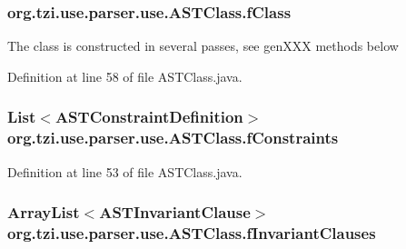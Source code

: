 \hypertarget{classorg_1_1tzi_1_1use_1_1parser_1_1use_1_1_a_s_t_class_ad31d3b0c19e264bc511403a79458cee6}{
\subsubsection[{f\-Class}]{ org.\-tzi.\-use.\-parser.\-use.\-A\-S\-T\-Class.\-f\-Class\hspace{0.3cm}{\ttfamily [protected]}}}\label{classorg_1_1tzi_1_1use_1_1parser_1_1use_1_1_a_s_t_class_ad31d3b0c19e264bc511403a79458cee6}
The class is constructed in several passes, see gen\-X\-X\-X methods below 

Definition at line 58 of file A\-S\-T\-Class.\-java.

\hypertarget{classorg_1_1tzi_1_1use_1_1parser_1_1use_1_1_a_s_t_class_aa87b63de84b1ab405c1b484ae663bdd5}{
\subsubsection[{f\-Constraints}]{\setlength{\rightskip}{0pt plus 5cm}List$<${\bf A\-S\-T\-Constraint\-Definition}$>$ org.\-tzi.\-use.\-parser.\-use.\-A\-S\-T\-Class.\-f\-Constraints\hspace{0.3cm}{\ttfamily [protected]}}}\label{classorg_1_1tzi_1_1use_1_1parser_1_1use_1_1_a_s_t_class_aa87b63de84b1ab405c1b484ae663bdd5}


Definition at line 53 of file A\-S\-T\-Class.\-java.

\hypertarget{classorg_1_1tzi_1_1use_1_1parser_1_1use_1_1_a_s_t_class_a45c44026ebececb733d4667e197cd219}{
\subsubsection[{f\-Invariant\-Clauses}]{\setlength{\rightskip}{0pt plus 5cm}Array\-List$<${\bf A\-S\-T\-Invariant\-Clause}$>$ org.\-tzi.\-use.\-parser.\-use.\-A\-S\-T\-Class.\-f\-Invariant\-Clauses\hspace{0.3cm}{\ttfamily [protected]}}}\label{classorg_1_1tzi_1_1use_1_1parser_1_1use_1_1_a_s_t_class_a45c44026ebececb733d4667e197cd219}


